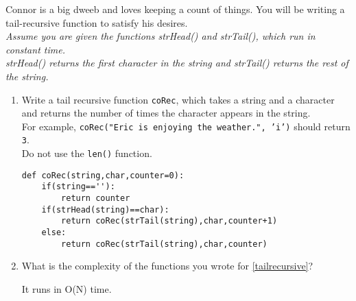 Connor is a big dweeb and loves keeping a count of things.
You will be writing a tail-recursive function to satisfy his desires.\\
\textit{Assume you are given the functions strHead() and strTail(), which run in constant time.\\
strHead() returns the first character in the string and strTail() returns the rest of the string.}
\begin{enumerate}

\item
\label{tailrecursive}
Write a tail recursive function \texttt{coRec}, which takes a string and a character and returns the number of times the character appears in the string. \\
For example, \texttt{coRec("Eric is enjoying the weather.", 'i')} should return \texttt{3}. \\
Do not use the \texttt{len()} function.
\begin{answer}
\begin{lstlisting}
def coRec(string,char,counter=0):
    if(string==''):
        return counter
    if(strHead(string)==char):
        return coRec(strTail(string),char,counter+1)
    else:
        return coRec(strTail(string),char,counter)
\end{lstlisting}
\end{answer}

\item
What is the complexity of the functions you wrote for \ref{tailrecursive}?
\begin{answer}

It runs in O(N) time. \\
\end{answer}
\end{enumerate}
